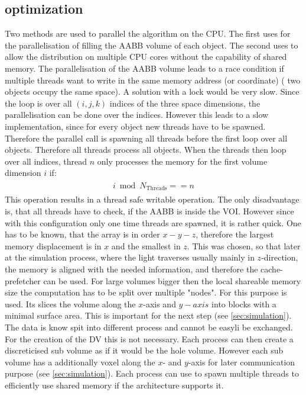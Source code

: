 \subsection{optimization}
% 
Two methods are used to parallel the algorithm on the \ac{CPU}.
The first uses \openmp{} for the parallelisation of filling the \ac{AABB} volume of each object.
The second uses \mpi{} to allow the distribution on multiple \ac{CPU} cores without the capability of shared memory. 
% 
The parallelisation of the \ac{AABB} volume leads to a race condition if multiple threads want to write in the same memory address (or coordinate) (\eg{} two objects occupy the same space).
A solution with a lock would be very slow.
Since the loop is over all $(i,j,k)$ indices of the three space dimensions, the parallelisation can be done over the indices.
However this leads to a slow implementation, since for every object new threads have to be spawned.
Therefore the parallel call is spawning all threads before the first loop over all objects.
Therefore all threads process all objects.
When the threads then loop over all indices, thread $n$ only processes the memory for the first volume dimension $i$ if:
% 
\begin{align}
\begin{split}
    i \bmod N_{\text{Threads}} == n
\end{split}
\end{align}
% 
This operation results in a thread safe writable operation.
The only disadvantage is, that all threads have to check, if the \ac{AABB} is inside the \ac{VOI}.
However since with this configuration only one time threads are spawned, it is rather quick.
One has to be known, that the array is in order $x-y-z$, therefore the largest memory displacement is in $x$ and the smallest in $z$.
This was chosen, so that later at the simulation process, where the light traverses usually mainly in $z$-direction, the memory is aligned with the needed information, and therefore the cache-prefetcher can be used.
% 
For large volumes bigger then the local shareable memory size the computation has to be split over multiple "nodes".
For this purpose \mpi{} is used.
Its slices the volume along the $x$-axis and $y-axis$ into blocks with a minimal surface area.
This is important for the next step (see \cref{sec:simulation}).
The data is know spit into different process and cannot be easyli be exchanged.
For the creation of the DV this is not necessary.
Each \mpi{} process can then create a discreticised sub volume as if it would be the hole volume.
However each sub volume has a additionally voxel along the $x$- and $y$-axis for later communication purpose (see \cref{sec:simulation}).
Each \mpi{} process can use \openmp{} to spawn multiple threads to efficiently use shared memory if the architecture supports it.
% 
% 
% 
